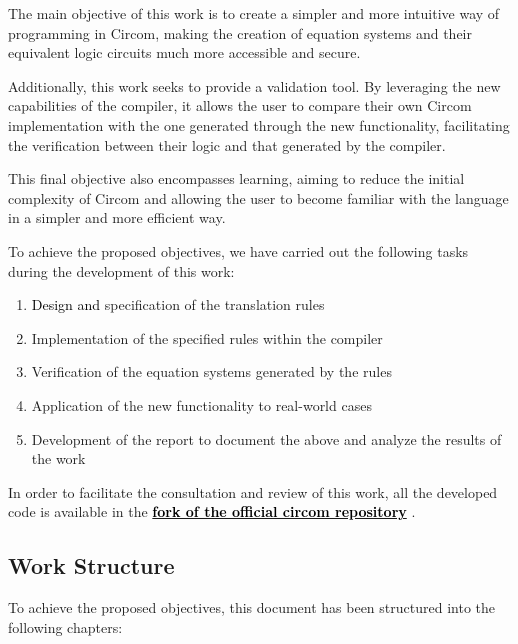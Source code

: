 \documentclass[a4paper,12pt]{report}
\begin{document}
	\noindent The main objective of this work is to create a simpler and more intuitive way of programming in Circom, making the creation of equation systems and their equivalent logic circuits much more accessible and secure.
	
	\vspace{0.2cm}
	\noindent Additionally, this work seeks to provide a validation tool. By leveraging the new capabilities of the compiler, it allows the user to compare their own Circom implementation with the one generated through the new functionality, facilitating the verification between their logic and that generated by the compiler.
	
	
	\vspace{0.2cm}
	\noindent This final objective also encompasses learning, aiming to reduce the initial complexity of Circom and allowing the user to become familiar with the language in a simpler and more efficient way.
	
	\vspace{0.2cm}
	\noindent To achieve the proposed objectives, we have carried out the following tasks during the development of this work:
	
	\begin{enumerate}
		\item \textcolor{black}{Design and} specification of the translation rules
		\item Implementation of the specified rules within the compiler
		\item Verification of the equation systems generated by the rules
		\item Application of the new functionality to real-world cases
		\item Development of the report to document the above and analyze the results of the work
	\end{enumerate}
	
	\vspace{0.2cm}
	\noindent In order to facilitate the consultation and review of this work, all the developed code is available in the \href{https://github.com/luciamarst/circom_autocomplete}{\textbf{\textcolor{black}{fork of the official circom repository}}} \cite{circom_autocomplete}.
	
	\subsection{Work Structure}
	
	\noindent To achieve the proposed objectives, this document has been structured into the following chapters:
	
\end{document}

